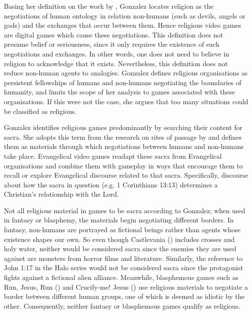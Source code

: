 Basing her definition on the work by \textcite{chidester_authentic_2005}, Gonzalez locates religion as the negotiations of human ontology in relation non-humans (such as devils, angels or gods) and the exchanges that occur between them. Hence religious video games are digital games which cause these negotiations. This definition does not presume belief or seriousness, since it only requires the existence of such negotiations and exchanges. In other words, one does not need to believe in religion to acknowledge that it exists. Nevertheless, this definition does not reduce non-human agents to analogies. Gonzalez defines religious organisations as persistent fellowships of humans and non-humans negotiating the boundaries of humanity, and limits the scope of her analysis to games associated with these organisations. If this were not the case, she argues that too many situations could be classified as religious.
 
Gonzalez identifies religious games predominantly by searching their content for sacra. She adopts this term from the research on rites of passage by \textcite{turner_forest_1967} and defines them as materials through which negotiations between humans and non-humans take place. Evangelical video games readapt these sacra from Evangelical organisations and combine them with gameplay in ways that encourage them to recall or explore Evangelical discourse related to that sacra. Specifically, discourse about how the sacra in question (e.g. 1 Corinthians 13:13) determines a Christian’s relationship with the Lord.


Not all religious material in games to be sacra according to Gonzalez; when used in fantasy or blasphemy, the materials begin negotiating different borders. In fantasy, non-humans are portrayed as fictional beings rather than agents whose existence shapes our own. So even though Castlevania () includes crosses and holy water, neither would be considered sacra since the enemies they are used against are monsters from horror films and literature. Similarly, the reference to John 1:17 in the Halo series would not be considered sacra since the protagonist fights against a fictional alien alliance. Meanwhile, blasphemous games such as Run, Jesus, Run () and Crucify-me! Jesus () use religious materials to negotiate a border between different human groups, one of which is deemed as idiotic by the other. Consequently, neither fantasy or blasphemous games qualify as religious.

